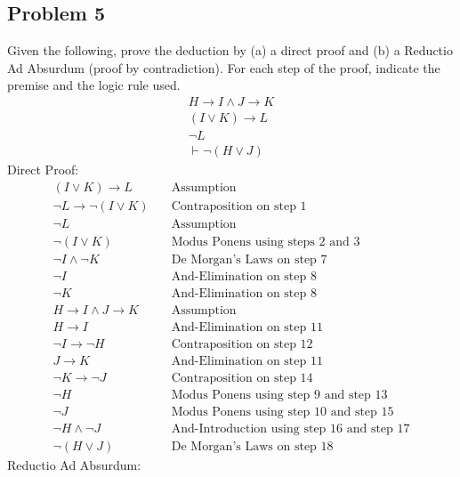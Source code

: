 \documentclass{math}
\begin{document}
\subsection*{Problem 5}
Given the following, prove the deduction by (a) a direct proof and (b) a
Reductio Ad Absurdum (proof by contradiction). For each step of the proof,
indicate the premise and the logic rule used.
\begin{gather*}
  H\to I\wedge J\to K \\
  (I\vee K)\to L \\
  \neg L \\
  \vdash\neg(H\vee J)
\end{gather*}
Direct Proof:
\begin{align}
  (I\vee K)\to L &\quad \text{Assumption} \\
  \neg L\to\neg(I\vee K) &\quad \text{Contraposition on step 1} \\
  \neg L &\quad \text{Assumption} \\
  \neg(I\vee K) &\quad \text{Modus Ponens using steps 2 and 3} \\
  \neg I\wedge\neg K &\quad \text{De Morgan's Laws on step 7} \\
  \neg I &\quad \text{And-Elimination on step 8} \\
  \neg K &\quad \text{And-Elimination on step 8} \\
  H\to I\wedge J\to K &\quad \text{Assumption} \\
  H\to I &\quad \text{And-Elimination on step 11} \\
  \neg I\to\neg H &\quad \text{Contraposition on step 12} \\
  J\to K &\quad \text{And-Elimination on step 11} \\
  \neg K\to\neg J &\quad \text{Contraposition on step 14} \\
  \neg H &\quad \text{Modus Ponens using step 9 and step 13} \\
  \neg J &\quad \text{Modus Ponens using step 10 and step 15} \\
  \neg H\wedge\neg J &\quad \text{And-Introduction using step 16 and step 17} \\
  \neg(H\vee J) &\quad \text{De Morgan's Laws on step 18}
\end{align}
Reductio Ad Absurdum:
\end{document}
